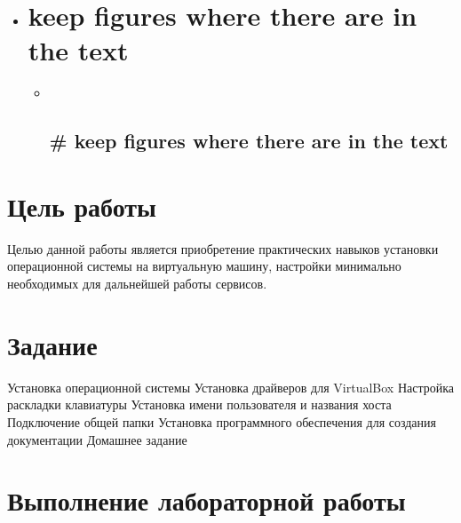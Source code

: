 \usepackage{indentfirst}

\begin{itemize}
\item
  \usepackage{float}

  \hypertarget{keep-figures-where-there-are-in-the-text}{%
  \section{keep figures where there are in the
  text}\label{keep-figures-where-there-are-in-the-text}}

  \begin{itemize}
  \item ~
    \hypertarget{keep-figures-where-there-are-in-the-text-1}{%
    \subsection{\texorpdfstring{ \# keep
    figures where there are in the
    text}{ \# keep figures where there are in the text}}\label{keep-figures-where-there-are-in-the-text-1}}
  \end{itemize}
\end{itemize}

\hypertarget{ux446ux435ux43bux44c-ux440ux430ux431ux43eux442ux44b}{%
\section{Цель
работы}\label{ux446ux435ux43bux44c-ux440ux430ux431ux43eux442ux44b}}

Целью данной работы является приобретение практических навыков установки
операционной системы на виртуальную машину, настройки минимально
необходимых для дальнейшей работы сервисов.

\hypertarget{ux437ux430ux434ux430ux43dux438ux435}{%
\section{Задание}\label{ux437ux430ux434ux430ux43dux438ux435}}

Установка операционной системы Установка драйверов для VirtualBox
Настройка раскладки клавиатуры Установка имени пользователя и названия
хоста Подключение общей папки Установка программного обеспечения для
создания документации Домашнее задание

\hypertarget{ux432ux44bux43fux43eux43bux43dux435ux43dux438ux435-ux43bux430ux431ux43eux440ux430ux442ux43eux440ux43dux43eux439-ux440ux430ux431ux43eux442ux44b}{%
\section{Выполнение лабораторной
работы}\label{ux432ux44bux43fux43eux43bux43dux435ux43dux438ux435-ux43bux430ux431ux43eux440ux430ux442ux43eux440ux43dux43eux439-ux440ux430ux431ux43eux442ux44b}}

